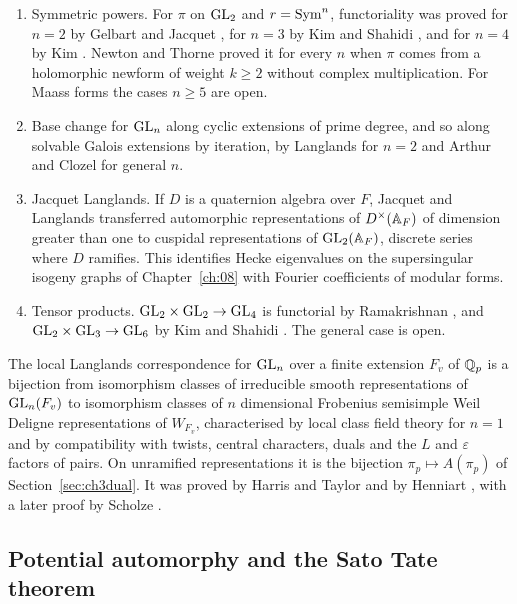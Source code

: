 \begin{enumerate}
\item Symmetric powers. For $\pi$ on $\mathrm{GL}_2$ and $r=\operatorname{Sym}^n$, functoriality was proved for $n=2$ by Gelbart and Jacquet \cite{gelbartjacquet1978}, for $n=3$ by Kim and Shahidi \cite{kimshahidi2002}, and for $n=4$ by Kim \cite{kimsarnak2003}. Newton and Thorne \cite{newtonthorne2021,newtonthorne2021b} proved it for every $n$ when $\pi$ comes from a holomorphic newform of weight $k\ge2$ without complex multiplication. For Maass forms the cases $n\ge5$ are open.
\item Base change for $\mathrm{GL}_n$ along cyclic extensions of prime degree, and so along solvable Galois extensions by iteration, by Langlands \cite{langlands1980} for $n=2$ and Arthur and Clozel \cite{arthurclozel1989} for general $n$.
\item Jacquet Langlands. If $D$ is a quaternion algebra over $F$, Jacquet and Langlands \cite{jacquetlanglands1970} transferred automorphic representations of $D^\times(\mathbb{A}_F)$ of dimension greater than one to cuspidal representations of $\mathrm{GL}_2(\mathbb{A}_F)$, discrete series where $D$ ramifies. This identifies Hecke eigenvalues on the supersingular isogeny graphs of Chapter~\ref{ch:08} with Fourier coefficients of modular forms.
\item Tensor products. $\mathrm{GL}_2\times\mathrm{GL}_2\to\mathrm{GL}_4$ is functorial by Ramakrishnan \cite{ramakrishnan2000}, and $\mathrm{GL}_2\times\mathrm{GL}_3\to\mathrm{GL}_6$ by Kim and Shahidi \cite{kimshahidi2002}. The general case is open.
\end{enumerate}

The local Langlands correspondence for $\mathrm{GL}_n$ over a finite extension $F_v$ of $\mathbb{Q}_p$ is a bijection from isomorphism classes of irreducible smooth representations of $\mathrm{GL}_n(F_v)$ to isomorphism classes of $n$ dimensional Frobenius semisimple Weil Deligne representations of $W_{F_v}$, characterised by local class field theory for $n=1$ and by compatibility with twists, central characters, duals and the $L$ and $\varepsilon$ factors of pairs. On unramified representations it is the bijection $\pi_p\mapsto A(\pi_p)$ of Section~\ref{sec:ch3dual}. It was proved by Harris and Taylor \cite{harristaylor2001} and by Henniart \cite{henniart2000}, with a later proof by Scholze \cite{scholze2013}.

\subsection{Potential automorphy and the Sato Tate theorem}

